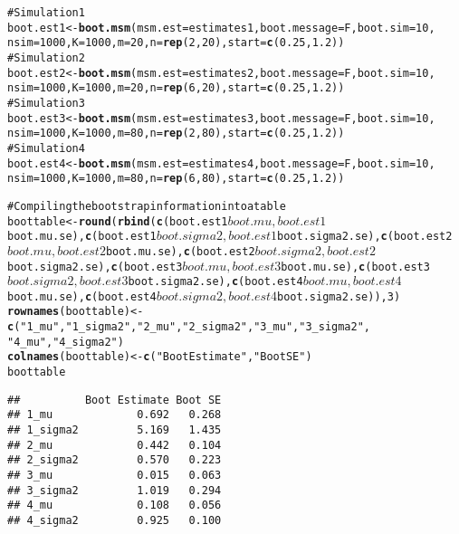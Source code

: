\documentclass{article}\usepackage{graphicx, color}
\makeatletter
\newcommand{\hlfunctioncall}[1]{\textcolor[rgb]{0.501960784313725,0,0.329411764705882}{\textbf{#1}}}%
\newcommand{\hlstring}[1]{\textcolor[rgb]{0.6,0.6,1}{#1}}%
\newcommand{\hlcomment}[1]{\textcolor[rgb]{0.180392156862745,0.6,0.341176470588235}{#1}}%
\newenvironment{kframe}{%
 \def\at@end@of@kframe{}%
 \ifinner\ifhmode%
  \def\at@end@of@kframe{\end{minipage}}%
  \begin{minipage}{\columnwidth}%
 \fi\fi%
 \def\FrameCommand##1{\hskip\@totalleftmargin \hskip-\fboxsep
 \colorbox{shadecolor}{##1}\hskip-\fboxsep
     \hskip-\linewidth \hskip-\@totalleftmargin \hskip\columnwidth}%
 \MakeFramed {\advance\hsize-\width
   \@totalleftmargin\z@ \linewidth\hsize
   \@setminipage}}%
 {\par\unskip\endMakeFramed%
 \at@end@of@kframe}
\newenvironment{knitrout}{}{} %
\makeatother
\begin{document}
\begin{knitrout}\footnotesize
{}\color{fgcolor}\begin{kframe}
\begin{alltt}
\hlcomment{# Simulation 1}
boot.est1 <- \hlfunctioncall{boot.msm}(msm.est = estimates1, boot.message = F, boot.sim = 10, 
    nsim = 1000, K = 1000, m = 20, n = \hlfunctioncall{rep}(2, 20), start = \hlfunctioncall{c}(0.25, 1.2))
\hlcomment{# Simulation 2}
boot.est2 <- \hlfunctioncall{boot.msm}(msm.est = estimates2, boot.message = F, boot.sim = 10, 
    nsim = 1000, K = 1000, m = 20, n = \hlfunctioncall{rep}(6, 20), start = \hlfunctioncall{c}(0.25, 1.2))
\hlcomment{# Simulation 3}
boot.est3 <- \hlfunctioncall{boot.msm}(msm.est = estimates3, boot.message = F, boot.sim = 10, 
    nsim = 1000, K = 1000, m = 80, n = \hlfunctioncall{rep}(2, 80), start = \hlfunctioncall{c}(0.25, 1.2))
\hlcomment{# Simulation 4}
boot.est4 <- \hlfunctioncall{boot.msm}(msm.est = estimates4, boot.message = F, boot.sim = 10, 
    nsim = 1000, K = 1000, m = 80, n = \hlfunctioncall{rep}(6, 80), start = \hlfunctioncall{c}(0.25, 1.2))
\end{alltt}
\end{kframe}
\end{knitrout}


\begin{knitrout}\footnotesize
{}\color{fgcolor}\begin{kframe}
\begin{alltt}
\hlcomment{# Compiling the bootstrap information into a table}
boottable <- \hlfunctioncall{round}(\hlfunctioncall{rbind}(\hlfunctioncall{c}(boot.est1$boot.mu, boot.est1$boot.mu.se), \hlfunctioncall{c}(boot.est1$boot.sigma2, 
    boot.est1$boot.sigma2.se), \hlfunctioncall{c}(boot.est2$boot.mu, boot.est2$boot.mu.se), \hlfunctioncall{c}(boot.est2$boot.sigma2, 
    boot.est2$boot.sigma2.se), \hlfunctioncall{c}(boot.est3$boot.mu, boot.est3$boot.mu.se), \hlfunctioncall{c}(boot.est3$boot.sigma2, 
    boot.est3$boot.sigma2.se), \hlfunctioncall{c}(boot.est4$boot.mu, boot.est4$boot.mu.se), \hlfunctioncall{c}(boot.est4$boot.sigma2, 
    boot.est4$boot.sigma2.se)), 3)
\hlfunctioncall{rownames}(boottable) <- \hlfunctioncall{c}(\hlstring{"1_mu"}, \hlstring{"1_sigma2"}, \hlstring{"2_mu"}, \hlstring{"2_sigma2"}, \hlstring{"3_mu"}, \hlstring{"3_sigma2"}, 
    \hlstring{"4_mu"}, \hlstring{"4_sigma2"})
\hlfunctioncall{colnames}(boottable) <- \hlfunctioncall{c}(\hlstring{"Boot Estimate"}, \hlstring{"Boot SE"})
boottable
\end{alltt}
\begin{verbatim}
##          Boot Estimate Boot SE
## 1_mu             0.692   0.268
## 1_sigma2         5.169   1.435
## 2_mu             0.442   0.104
## 2_sigma2         0.570   0.223
## 3_mu             0.015   0.063
## 3_sigma2         1.019   0.294
## 4_mu             0.108   0.056
## 4_sigma2         0.925   0.100
\end{verbatim}
\end{kframe}
\end{knitrout}
\end{document}
